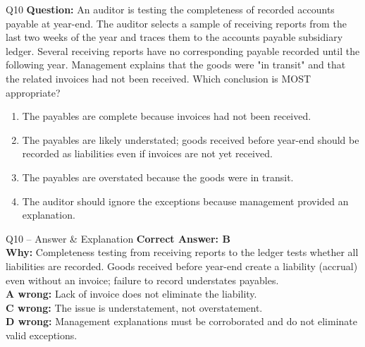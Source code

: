 \documentclass[aspectratio=169,10pt]{beamer}
\begin{document}
	\begin{frame}[t]{Q10}
		\small
		\textbf{Question:} An auditor is testing the completeness of recorded accounts payable at year-end. The auditor selects a sample of receiving reports from the last two weeks of the year and traces them to the accounts payable subsidiary ledger. Several receiving reports have no corresponding payable recorded until the following year. Management explains that the goods were "in transit" and that the related invoices had not been received. Which conclusion is MOST appropriate?
		\begin{enumerate}[label=\Alph*.,itemsep=1pt,topsep=2pt]
			\item The payables are complete because invoices had not been received.
			\item The payables are likely understated; goods received before year-end should be recorded as liabilities even if invoices are not yet received.
			\item The payables are overstated because the goods were in transit.
			\item The auditor should ignore the exceptions because management provided an explanation.
		\end{enumerate}
	\end{frame}
	
	\begin{frame}[t]{Q10 -- Answer \& Explanation}
		\small
		\textbf{Correct Answer: B} \\[4pt]
		\textbf{Why:} Completeness testing from receiving reports to the ledger tests whether all liabilities are recorded. Goods received before year-end create a liability (accrual) even without an invoice; failure to record understates payables. \\[4pt]
		\textbf{A wrong:} Lack of invoice does not eliminate the liability. \\[2pt]
		\textbf{C wrong:} The issue is understatement, not overstatement. \\[2pt]
		\textbf{D wrong:} Management explanations must be corroborated and do not eliminate valid exceptions.
	\end{frame}
	
\end{document}
